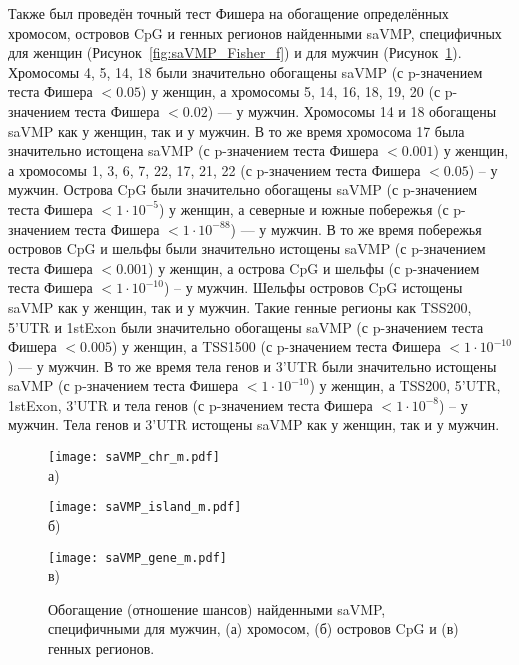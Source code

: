 Также был проведён точный тест Фишера \autocite{fisher2006statistical} на обогащение определённых хромосом, островов CpG и генных регионов найденными saVMP, специфичных для женщин (Рисунок~\ref{fig:saVMP_Fisher_f}) и для мужчин (Рисунок~\ref{fig:saVMP_Fisher_m}). Хромосомы 4, 5, 14, 18 были значительно обогащены saVMP (с p-значением теста Фишера $< 0.05$) у женщин, а хромосомы 5, 14, 16, 18, 19, 20 (с p-значением теста Фишера $< 0.02$) --- у мужчин. Хромосомы 14 и 18 обогащены saVMP как у женщин, так и у мужчин. В то же время хромосома 17 была значительно истощена saVMP (с p-значением теста Фишера $< 0.001$) у женщин, а хромосомы 1, 3, 6, 7, 22, 17, 21, 22 (с p-значением теста Фишера $< 0.05$) -- у мужчин. Острова CpG были значительно обогащены saVMP (с p-значением теста Фишера $< 1 \cdot 10^{-5}$) у женщин, а северные и южные побережья (с p-значением теста Фишера $< 1 \cdot 10^{-88}$) --- у мужчин. В то же время побережья островов CpG и шельфы были значительно истощены saVMP (с p-значением теста Фишера $< 0.001$) у женщин, а острова CpG и шельфы (с p-значением теста Фишера $< 1 \cdot 10^{-10}$) -- у мужчин. Шельфы островов CpG истощены saVMP как у женщин, так и у мужчин. Такие генные регионы как TSS200, 5'UTR и 1stExon были значительно обогащены saVMP (с p-значением теста Фишера $< 0.005$) у женщин, а TSS1500 (с p-значением теста Фишера $< 1 \cdot 10^{-10}$) --- у мужчин. В то же время тела генов и 3'UTR были значительно истощены saVMP (с p-значением теста Фишера $< 1 \cdot 10^{-10}$) у женщин, а TSS200, 5'UTR, 1stExon, 3'UTR и тела генов (с p-значением теста Фишера $< 1 \cdot 10^{-8}$) -- у мужчин. Тела генов и 3'UTR истощены saVMP как у женщин, так и у мужчин.

\begin{figure}[ht]
	\begin{minipage}[b][][b]{0.49\linewidth}\centering
		\texttt{[image: saVMP\_chr\_m.pdf]} \\ а)
	\end{minipage}
	\hfill
	\begin{minipage}[b][][b]{0.49\linewidth}\centering
		\texttt{[image: saVMP\_island\_m.pdf]} \\ б)
	\end{minipage}
	\begin{minipage}[b][][b]{0.99\linewidth}\centering
		\texttt{[image: saVMP\_gene\_m.pdf]} \\ в)
	\end{minipage}
	\caption[Обогащение найденными saVMP, специфичными для мужчин, хромосом, островов CpG и генных регионов.]{Обогащение (отношение шансов) найденными saVMP, специфичными для мужчин, (а) хромосом, (б) островов CpG и (в) генных регионов.}
	\label{fig:saVMP_Fisher_m}
\end{figure}

